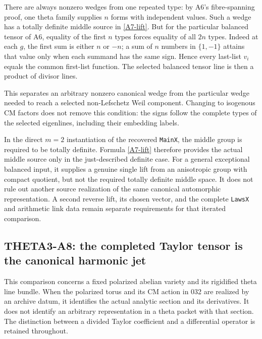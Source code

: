 \documentclass[11pt]{article}
\theoremstyle{definition}\newtheorem{definition}[theorem]{Definition}\newtheorem{remark}[theorem]{Remark}
\begin{document}
There are always nonzero wedges from one repeated type: by A6's
fibre-spanning proof, one theta family supplies $n$ forms with
independent values. Such a wedge has a totally definite middle
source in \eqref{A7-lift}. But for the particular balanced tensor
of A6, equality of the first $n$ types forces equality of all
$2n$ types. Indeed at each $g$, the first sum is either $n$ or
$-n$; a sum of $n$ numbers in $\{1,-1\}$ attains that value
only when each summand has the same sign. Hence every last-list
$v_i$ equals the common first-list function. The selected
balanced tensor line is then a product of divisor lines.

This separates an arbitrary nonzero canonical wedge from the
particular wedge needed to reach a selected non-Lefschetz
Weil component. Changing to isogenous CM factors does not
remove this condition: the signs follow the complete types of
the selected eigenlines, including their embedding labels.

In the direct $m=2$ instantiation of the recovered
\texttt{MainX}, the middle group is required to be totally
definite. Formula \eqref{A7-lift} therefore provides the actual
middle source only in the just-described definite case.
For a general exceptional balanced input, it supplies a genuine
single lift from an anisotropic group with compact quotient,
but not the required totally definite middle space. It does
not rule out another source realization of the same canonical
automorphic representation. A second reverse lift, its chosen
vector, and the complete \texttt{LawsX} and arithmetic link data
remain separate requirements for that iterated comparison.


\subsection{THETA3-A8: the completed Taylor tensor is the canonical harmonic jet}\label{A8}

This comparison concerns a fixed polarized abelian variety and its
rigidified theta line bundle.  When the polarized torus and its CM
action in 032 are realized by an archive datum, it identifies the
actual analytic section and its derivatives.  It does not identify
an arbitrary representation in a theta packet with that section.
The distinction between a divided Taylor coefficient and a
differential operator is retained throughout.
\end{document}
